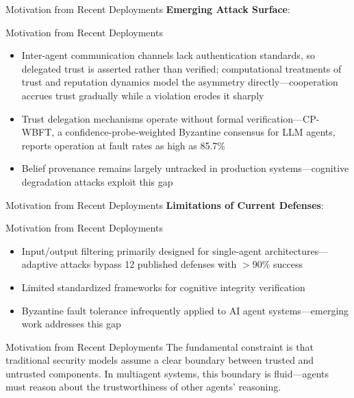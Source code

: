 \documentclass[
  ignorenonframetext,
]{beamer}
\begin{document}
\begin{frame}[allowframebreaks]{Motivation from Recent Deployments}
\textbf{Emerging Attack Surface}:

\end{frame}

\begin{frame}[allowframebreaks]{Motivation from Recent Deployments}
\begin{itemize}
\item Inter-agent communication channels lack authentication standards, so delegated trust is asserted rather than verified; computational treatments of trust and reputation dynamics model the asymmetry directly---cooperation accrues trust gradually while a violation erodes it sharply \cite{trustdynamics2025}
\item Trust delegation mechanisms operate without formal verification---CP-WBFT, a confidence-probe-weighted Byzantine consensus for LLM agents, reports operation at fault rates as high as 85.7\% \cite{cpwbft2025}
\item Belief provenance remains largely untracked in production systems---cognitive degradation attacks exploit this gap \cite{cdr2025}
\end{itemize}

\end{frame}

\begin{frame}[allowframebreaks]{Motivation from Recent Deployments}
\textbf{Limitations of Current Defenses}:

\end{frame}

\begin{frame}[allowframebreaks]{Motivation from Recent Deployments}
\begin{itemize}
\item Input/output filtering primarily designed for single-agent architectures---adaptive attacks bypass 12 published defenses with $>$90\% success \cite{adaptive2025attacks}
\item Limited standardized frameworks for cognitive integrity verification
\item Byzantine fault tolerance infrequently applied to AI agent systems---emerging work addresses this gap \cite{jo2025byzantine}
\end{itemize}

\end{frame}

\begin{frame}[allowframebreaks]{Motivation from Recent Deployments}
The fundamental constraint is that traditional security models assume a
clear boundary between trusted and untrusted components. In multiagent
systems, this boundary is fluid---agents must reason about the
trustworthiness of other agents' reasoning.
\end{frame}
\end{document}
